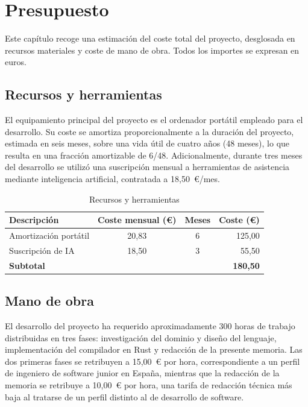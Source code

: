 \chapter{Presupuesto}
\label{ch:presupuesto}

Este capítulo recoge una estimación del coste total del proyecto, desglosada en recursos materiales y coste de mano de obra. Todos los importes se expresan en euros.

\section{Recursos y herramientas}

El equipamiento principal del proyecto es el ordenador portátil empleado para el desarrollo. Su coste se amortiza proporcionalmente a la duración del proyecto, estimada en seis meses, sobre una vida útil de cuatro años (48 meses), lo que resulta en una fracción amortizable de 6/48. Adicionalmente, durante tres meses del desarrollo se utilizó una suscripción mensual a herramientas de asistencia mediante inteligencia artificial, contratada a 18,50~€/mes.

\begin{table}[!ht]
\centering
\caption{Recursos y herramientas}
\label{tbl:recursos}
\begin{tabularx}{0.85\textwidth}{Xccr}
    \toprule
    \textbf{Descripción} & \textbf{Coste mensual (€)} & \textbf{Meses} & \textbf{Coste (€)} \\
    \midrule
    Amortización portátil & 20,83 & 6 & 125,00 \\
    Suscripción de IA & 18,50 & 3 & 55,50 \\
    \midrule
    \textbf{Subtotal} & & & \textbf{180,50} \\
    \bottomrule
\end{tabularx}
\end{table}

\section{Mano de obra}

El desarrollo del proyecto ha requerido aproximadamente 300 horas de trabajo distribuidas en tres fases: investigación del dominio y diseño del lenguaje, implementación del compilador en Rust y redacción de la presente memoria. Las dos primeras fases se retribuyen a 15,00~€ por hora, correspondiente a un perfil de ingeniero de software junior en España, mientras que la redacción de la memoria se retribuye a 10,00~€ por hora, una tarifa de redacción técnica más baja al tratarse de un perfil distinto al de desarrollo de software.

